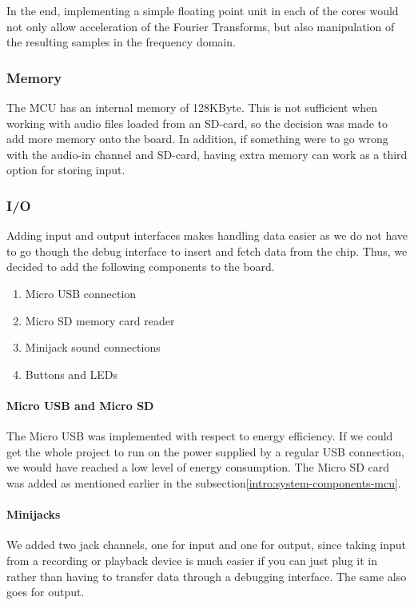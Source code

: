 In the end, implementing a simple floating point unit in each of the cores
would not only allow acceleration of the Fourier Transforms, but also
manipulation of the resulting samples in the frequency domain.

\subsubsection{Memory}

The MCU has an internal memory of 128KByte. This is not sufficient when working
with audio files loaded from an SD-card, so the decision was made to add more
memory onto the board. In addition, if something were to go wrong with the
audio-in channel and SD-card, having extra memory can work as a third option for
storing input.

\subsubsection{I/O}

Adding input and output interfaces makes handling data easier as we do not have
to go though the debug interface to insert and fetch data from the chip. Thus,
we decided to add the following components to the board.

\begin{enumerate}
	\item Micro USB connection
	\item Micro SD memory card reader
	\item Minijack sound connections
	\item Buttons and LEDs
\end{enumerate}

\paragraph{Micro USB and Micro SD}

The Micro USB was implemented with respect to energy efficiency. If we could get
the whole project to run on the power supplied by a regular USB connection, we
would have reached a low level of energy consumption. The Micro SD card was
added as mentioned earlier in the subsection\ref{intro:system-components-mcu}.

\paragraph{Minijacks}

We added two jack channels, one for input and one for output, since taking input
from a recording or playback device is much easier if you can just plug it in
rather than having to transfer data through a debugging interface. The same also
goes for output.

